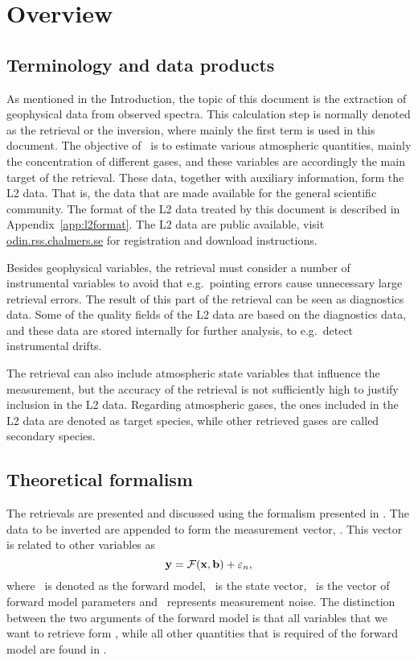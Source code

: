 \chapter{Overview}
\label{chapter:overview}


\section{Terminology and data products}
\label{sec:terminology}
%
As mentioned in the Introduction, the topic of this document is the extraction
of geophysical data from observed spectra. This calculation step is normally
denoted as the retrieval or the inversion, where mainly the first term is used
in this document. The objective of \smr\ is to estimate various atmospheric
quantities, mainly the concentration of different gases, and these variables
are accordingly the main target of the retrieval. These data, together with
auxiliary information, form the L2 data. That is, the data that are made
available for the general scientific community. The format of the L2 data
treated by this document is described in Appendix~\ref{app:l2format}. The L2
data are public available, visit \url{odin.rss.chalmers.se} for registration
and download instructions.

Besides geophysical variables, the retrieval must consider a number of
instrumental variables to avoid that e.g.\ pointing errors cause unnecessary
large retrieval errors. The result of this part of the retrieval can be seen as
diagnostics data. Some of the quality fields of the L2 data are based on the
diagnostics data, and these data are stored internally for further analysis, to
e.g.\ detect instrumental drifts. 

The retrieval can also include atmospheric state variables that influence the
measurement, but the accuracy of the retrieval is not sufficiently high to
justify inclusion in the L2 data. Regarding atmospheric gases, the ones
included in the L2 data are denoted as target species, while other retrieved
gases are called secondary species.



\section{Theoretical formalism}
\label{sec:formalism}
%
The retrievals are presented and discussed using the formalism presented in
\citet[][Ch.~3]{rodgers:00}. The data to be inverted are appended to form the
measurement vector, \MsrVct. This vector is related to other variables as
\begin{equation}
  \label{eq:fmodel1}
  \mathbf{y} = \mathcal{F}(\mathbf{x},\mathbf{b}) + \varepsilon_n,
\end{equation}
where \FrwMdl\ is denoted as the forward model, \SttVct\ is the state vector,
\FrwMdlVct\ is the vector of forward model parameters and \MsrErrVct\
represents measurement noise. The distinction between the two arguments of the
forward model is that all variables that we want to retrieve form \SttVct,
while all other quantities that is required of the forward model are found in
\FrwMdlVct. 

